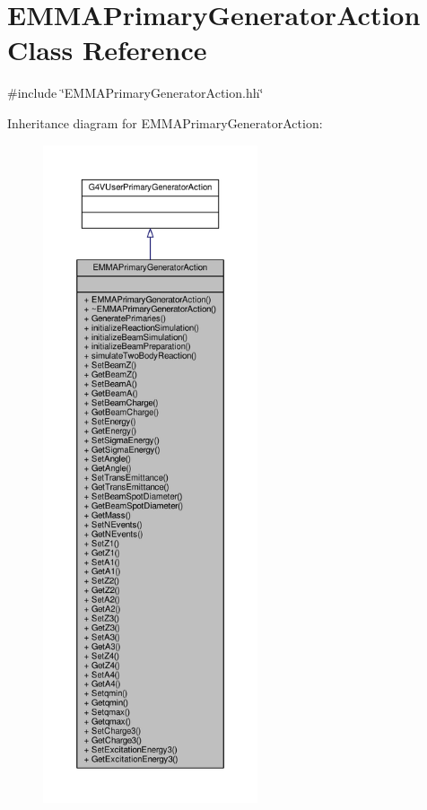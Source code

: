 \hypertarget{classEMMAPrimaryGeneratorAction}{}\section{E\+M\+M\+A\+Primary\+Generator\+Action Class Reference}
\label{classEMMAPrimaryGeneratorAction}


{\ttfamily \#include \char`\"{}E\+M\+M\+A\+Primary\+Generator\+Action.\+hh\char`\"{}}



Inheritance diagram for E\+M\+M\+A\+Primary\+Generator\+Action\+:
\nopagebreak
\begin{figure}[H]
\begin{center}
\leavevmode
\includegraphics[height=550pt]{classEMMAPrimaryGeneratorAction__inherit__graph}
\end{center}
\end{figure}


